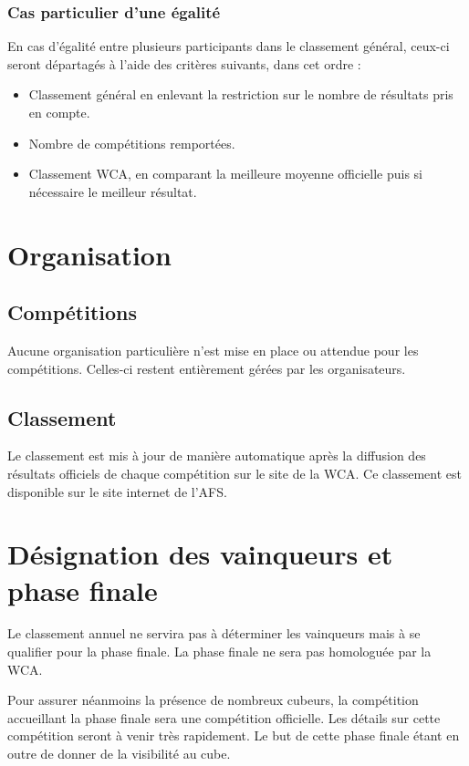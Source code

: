 \documentclass[10pt,a4paper]{article}
\newcommand{\3}{$3\times3$}
\newcommand{\4}{$4\times4$}
\newcommand{\2}{$2\times2$}
\begin{document}
\subsubsection{Cas particulier d'une égalité}

En cas d'égalité entre plusieurs participants dans le classement général, ceux-ci seront départagés à l'aide des critères suivants, dans cet ordre :

\begin{itemize}
\item Classement général en enlevant la restriction sur le nombre de résultats pris en compte.
\item Nombre de compétitions remportées.
\item Classement WCA, en comparant la meilleure moyenne officielle puis si nécessaire le meilleur résultat.
\end{itemize}


\section{Organisation}

\subsection{Compétitions}

Aucune organisation particulière n'est mise en place ou attendue pour les compétitions. Celles-ci restent entièrement gérées par les organisateurs.

\subsection{Classement}

Le classement est mis à jour de manière automatique après la diffusion des résultats officiels de chaque compétition sur le site de la WCA. Ce classement est disponible sur le site internet de l'AFS.

\section{Désignation des vainqueurs et phase finale}

Le classement annuel ne servira pas à déterminer les vainqueurs mais à se qualifier pour la phase finale. La phase finale ne sera pas homologuée par la WCA. 

Pour assurer néanmoins la présence de nombreux cubeurs, la compétition accueillant la phase finale sera une compétition officielle. Les détails sur cette compétition seront à venir très rapidement. Le but de cette phase finale étant en outre de donner de la visibilité au cube.
\end{document}
